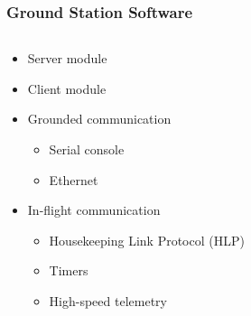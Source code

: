 \documentclass[landscape,xcolor={table}]{beamer}
\begin{document}
	\begin{frame}
		
		\frametitle{Ground Station Software}
		
		\begin{columns}[T] %
		\begin{column}{.53\textwidth}

			 \begin{itemize}
						  	\item{Server module}
						  	\item{Client module}
						  	\item{Grounded communication}
						  	\begin{itemize}
						  		\item{Serial console}
						  		\item{Ethernet}
						  	\end{itemize}
						  	\item{In-flight communication}
							\begin{itemize}
						  		\item{Housekeeping Link Protocol (HLP)}
						  		\item{Timers}
						  		\item{High-speed telemetry}
						  	\end{itemize}
			 \end{itemize}
			
		\end{column}%
		\hfill%
		\begin{column}{.45\textwidth}


\end{column}
\end{columns}
\end{frame}
\end{document}
